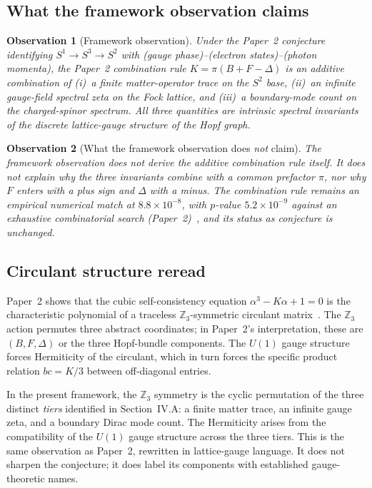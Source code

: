 \documentclass[aps,pra,twocolumn,superscriptaddress,longbibliography]{revtex4-2}
\newtheorem{observation}{Observation}
\begin{document}
\subsection{What the framework observation claims}

\begin{observation}[Framework observation]
\label{obs:framework}
Under the Paper~2 conjecture identifying $S^1 \to S^3 \to S^2$ with
(gauge phase)--(electron states)--(photon momenta), the Paper~2
combination rule $K = \pi(B + F - \Delta)$ is an additive combination
of (i)~a finite matter-operator trace on the $S^2$ base, (ii)~an
infinite gauge-field spectral zeta on the Fock lattice, and (iii)~a
boundary-mode count on the charged-spinor spectrum.  All three
quantities are intrinsic spectral invariants of the discrete
lattice-gauge structure of the Hopf graph.
\end{observation}

\begin{observation}[What the framework observation does \emph{not}
claim]
\label{obs:not_claim}
The framework observation does not derive the additive combination
rule itself.  It does not explain why the three invariants combine
with a common prefactor $\pi$, nor why $F$ enters with a plus sign
and $\Delta$ with a minus.  The combination rule remains an
empirical numerical match at $8.8 \times 10^{-8}$, with $p$-value
$5.2 \times 10^{-9}$ against an exhaustive combinatorial search
(Paper~2)~\cite{Paper2}, and its status as conjecture is unchanged.
\end{observation}

\subsection{Circulant structure reread}

Paper~2 shows that the cubic self-consistency equation
$\alpha^3 - K\alpha + 1 = 0$ is the characteristic polynomial of a
traceless $\mathbb{Z}_3$-symmetric circulant
matrix~\cite{Paper2}.  The $\mathbb{Z}_3$ action
permutes three abstract coordinates; in Paper~2's interpretation,
these are $(B, F, \Delta)$ or the three Hopf-bundle components.  The
$U(1)$ gauge structure forces Hermiticity of the circulant, which in
turn forces the specific product relation $bc = K/3$ between
off-diagonal entries.

In the present framework, the $\mathbb{Z}_3$ symmetry is the cyclic
permutation of the three distinct \emph{tiers} identified in
Section~IV.A: a finite matter trace, an infinite gauge zeta, and a
boundary Dirac mode count.  The Hermiticity arises from the
compatibility of the $U(1)$ gauge structure across the three tiers.
This is the same observation as Paper~2, rewritten in
lattice-gauge language.  It does not sharpen the conjecture; it does
label its components with established gauge-theoretic names.
\end{document}
